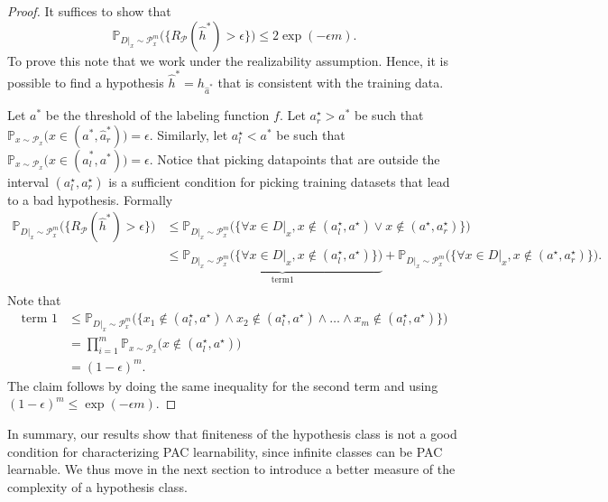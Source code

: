 \begin{proof}
	It suffices to show that 
	$$
	\mathbb{P}_{D|_x \sim \mathcal{P}^m_x} \bigl( \{ R_\mathcal{P}(\hat{h}^*) > \epsilon \}\bigr) \leq 2 \exp(-\epsilon m).
	$$
	To prove this note that we work under the realizability assumption. Hence,
	it is possible to find a hypothesis $\hat{h}^* = h_{\hat{a}^*}$ that is
	consistent with the training data. 
	
	Let $a^*$ be the threshold of the labeling function $f$. Let $a^\star _r >a^*$ be such that $\mathbb{P}_{x \sim \mathcal{P}_x}\bigl(x \in (a^*,
	\hat{a}^*_r)\bigr)= \epsilon$. Similarly, let $a^\star_l <a^*$ be such
	that $\mathbb{P}_{x \sim \mathcal{P}_x}\bigl(x \in (\hat{a}^*_l, a^*)\bigr)=
	\epsilon$. Notice that picking datapoints that are outside the interval
	$(a^\star_l, a^\star_r)$ is a sufficient condition for picking training datasets that lead to a bad
	hypothesis. Formally
	\begin{align*} 
	\mathbb{P}_{D|_x \sim \mathcal{P}^m_x} \bigl( \{ R_\mathcal{P}(\hat{h}^*) > \epsilon \}\bigr) &\leq \mathbb{P}_{D|_x \sim \mathcal{P}^m_x} \bigl(\{\forall x \in D|_x,  x \notin (a^\star_l, a^\star) \vee x \notin (a^\star, a^\star_r)\}\bigr) \\
	&\leq \underbrace{\mathbb{P}_{D|_x \sim \mathcal{P}^m_x} \bigl(\{\forall x \in D|_x,  x \notin (a^\star_l, a^\star) \}\bigr)}_{\text{term} 1} + \mathbb{P}_{D|_x \sim \mathcal{P}^m_x} \bigl(\{\forall x \in D|_x,  x \notin (a^\star, a^\star_r)\}\bigr). \\
	\end{align*}
	Note that 
	\begin{align*}
		\text{term }1 &\leq \mathbb{P}_{D|_x \sim \mathcal{P}^m_x} \bigl(\{x_1 \notin (a^\star_l, a^\star) \wedge x_2 \notin (a^\star_l, a^\star) \wedge \dots \wedge x_m \notin (a^\star_l, a^\star) \}\bigr)\\
		&= \prod_{i=1}^m \mathbb{P}_{x \sim \mathcal{P}_x} \bigl(x \notin (a^\star_l, a^\star)\bigr)\\
		&= (1-\epsilon)^m.
	\end{align*}
	The claim follows by doing the same inequality for the second term and using $(1-\epsilon)^m \leq \exp(-\epsilon m)$.
\end{proof}
In summary, our results show that finiteness of the hypothesis class is not a
good condition for characterizing PAC learnability, since infinite classes can
be PAC learnable. We thus move in the next section to introduce a better measure
of the complexity of a hypothesis class.

